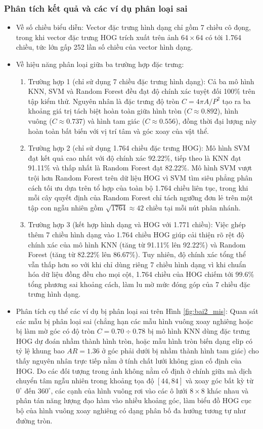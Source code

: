 \documentclass[12pt,a4paper]{article}
\begin{document}
\subsubsection*{Phân tích kết quả và các ví dụ phân loại sai}
\begin{itemize}
    \item Về số chiều biểu diễn: Vector đặc trưng hình dạng chỉ gồm 7 chiều cô đọng, trong khi vector đặc trưng HOG trích xuất trên ảnh $64 \times 64$ có tới 1.764 chiều, tức lớn gấp 252 lần số chiều của vector hình dạng.
    \item Về hiệu năng phân loại giữa ba trường hợp đặc trưng:
    \begin{enumerate}
        \item Trường hợp 1 (chỉ sử dụng 7 chiều đặc trưng hình dạng): Cả ba mô hình KNN, SVM và Random Forest đều đạt độ chính xác tuyệt đối 100\% trên tập kiểm thử. Nguyên nhân là đặc trưng độ tròn $C = 4\pi A/P^2$ tạo ra ba khoảng giá trị tách biệt hoàn toàn giữa hình tròn ($C \approx 0.892$), hình vuông ($C \approx 0.737$) và hình tam giác ($C \approx 0.556$), đồng thời đại lượng này hoàn toàn bất biến với vị trí tâm và góc xoay của vật thể.
        \item Trường hợp 2 (chỉ sử dụng 1.764 chiều đặc trưng HOG): Mô hình SVM đạt kết quả cao nhất với độ chính xác 92.22\%, tiếp theo là KNN đạt 91.11\% và thấp nhất là Random Forest đạt 82.22\%. Mô hình SVM vượt trội hơn Random Forest trên dữ liệu HOG vì SVM tìm siêu phẳng phân cách tối ưu dựa trên tổ hợp của toàn bộ 1.764 chiều liên tục, trong khi mỗi cây quyết định của Random Forest chỉ tách ngưỡng đơn lẻ trên một tập con ngẫu nhiên gồm $\sqrt{1764} \approx 42$ chiều tại mỗi nút phân nhánh.
        \item Trường hợp 3 (kết hợp hình dạng và HOG với 1.771 chiều): Việc ghép thêm 7 chiều hình dạng vào 1.764 chiều HOG giúp cải thiện rõ rệt độ chính xác của mô hình KNN (tăng từ 91.11\% lên 92.22\%) và Random Forest (tăng từ 82.22\% lên 86.67\%). Tuy nhiên, độ chính xác tổng thể vẫn thấp hơn so với khi chỉ dùng riêng 7 chiều hình dạng vì khi chuẩn hóa dữ liệu đồng đều cho mọi cột, 1.764 chiều của HOG chiếm tới $99.6\%$ tổng phương sai khoảng cách, làm lu mờ mức đóng góp của 7 chiều đặc trưng hình dạng.
    \end{enumerate}
    \item Phân tích cụ thể các ví dụ bị phân loại sai trên Hình \ref{fig:bai2_mis}: Quan sát các mẫu bị phân loại sai (chẳng hạn các mẫu hình vuông xoay nghiêng hoặc bị làm mờ góc có độ tròn $C = 0.70 \div 0.78$ bị mô hình KNN dùng đặc trưng HOG dự đoán nhầm thành hình tròn, hoặc mẫu hình tròn biến dạng elip có tỷ lệ khung bao $AR = 1.36$ ở góc phải dưới bị nhầm thành hình tam giác) cho thấy nguyên nhân trực tiếp nằm ở tính chất lưới không gian cố định của HOG. Do các đối tượng trong ảnh không nằm cố định ở chính giữa mà dịch chuyển tâm ngẫu nhiên trong khoảng tọa độ $[44, 84]$ và xoay góc bất kỳ từ $0^\circ$ đến $360^\circ$, các cạnh của hình vuông rơi vào các ô lưới $8 \times 8$ khác nhau và phân tán năng lượng đạo hàm vào nhiều khoảng góc, làm biểu đồ HOG cục bộ của hình vuông xoay nghiêng có dạng phân bố đa hướng tương tự như đường tròn.
\end{itemize}
\end{document}

